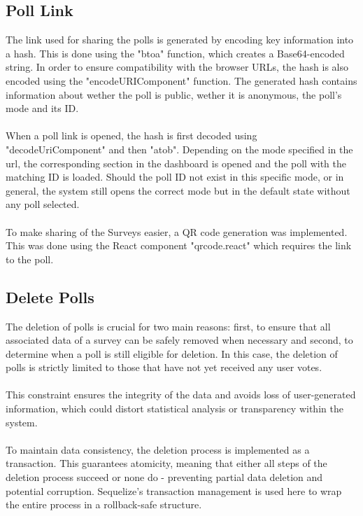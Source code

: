 \documentclass[a4paper,12pt]{report}
\begin{document}
\subsection{Poll Link}
The link used for sharing the polls is generated by encoding key information into a hash. This is done using the "btoa" function, which creates a Base64-encoded string. In order to ensure compatibility with the browser URLs, the hash is also encoded using the "encodeURIComponent" function. The generated hash contains information about wether the poll is public, wether it is anonymous, the poll's mode and its ID.\parencite{mdn-btoa}\parencite{mdn-encodeUriComponent}\\\\
When a poll link is opened, the hash is first decoded using "decodeUriComponent" and then "atob". Depending on the mode specified in the url, the corresponding section in the dashboard is opened and the poll with the matching ID is loaded. Should the poll ID not exist in this specific mode, or in general, the system still opens the correct mode but in the default state without any poll selected.\parencite{mdn-atob}\parencite{mdn-decodeUriComponent}\\\\
To make sharing of the Surveys easier, a QR code generation was implemented. This was done using the React component "qrcode.react" which requires the link to the poll.\parencite{qrcode}
\subsection{Delete Polls}
The deletion of polls is crucial for two main reasons: first, to ensure that all associated data of a survey can be safely removed when necessary and second, to determine when a poll is still eligible for deletion. In this case, the deletion of polls is strictly limited to those that have not yet received any user votes. \\ \\
This constraint ensures the integrity of the data and avoids loss of user-generated information, which could distort statistical analysis or transparency within the system.\\ \\
To maintain data consistency, the deletion process is implemented as a transaction. This guarantees atomicity, meaning that either all steps of the deletion process succeed or none do - preventing partial data deletion and potential corruption. Sequelize's transaction management is used here to wrap the entire process in a rollback-safe structure. \parencite{sequelizedoku}
\end{document}
